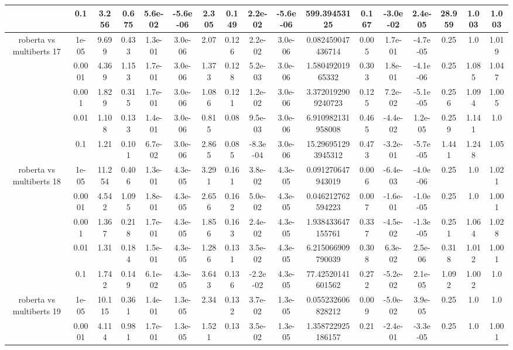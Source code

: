 \begin{tabular}{|c|c|c|c|c|c|c|c|c|c|c|c|c|c|c|c|c|}
 & 0.1 & 3.256 & 0.675 & 5.6e-02 & -5.6e-06 & 2.305 & 0.149 & 2.2e-02 & -5.6e-06 & 599.39453125 & 0.167 & -3.0e-02 & 2.4e-05 & 28.959 & 1.003 & 1.003 \\
\hline
\multirow{5}{*}{roberta  vs multiberts 17} & 1e-05 & 9.699 & 0.433 & 1.3e-01 & 3.0e-06 & 2.07 & 0.126 & 2.2e-02 & 3.0e-06 & 0.082459047436714 & 0.005 & 1.7e-01 & -4.7e-05 & 0.25 & 1.0 & 1.019 \\
 & 0.0001 & 4.369 & 1.153 & 1.7e-01 & 3.0e-06 & 1.373 & 0.128 & 5.2e-03 & 3.0e-06 & 1.58049201965332 & 0.303 & 1.8e-01 & -4.1e-06 & 0.25 & 1.085 & 1.047 \\
 & 0.001 & 1.829 & 0.315 & 1.7e-01 & 3.0e-06 & 1.086 & 0.121 & 1.2e-02 & 3.0e-06 & 3.3720192909240723 & 0.125 & 7.2e-02 & -5.1e-05 & 0.256 & 1.094 & 1.005 \\
 & 0.01 & 1.108 & 0.133 & 1.4e-01 & 3.0e-06 & 0.815 & 0.08 & 9.5e-03 & 3.0e-06 & 6.910982131958008 & 0.465 & -4.4e-02 & 1.2e-05 & 0.259 & 1.141 & 1.0 \\
 & 0.1 & 1.21 & 0.101 & 6.7e-02 & 3.0e-06 & 2.865 & 0.085 & -8.3e-04 & 3.0e-06 & 15.296951293945312 & 0.473 & -3.2e-01 & -5.7e-05 & 1.441 & 1.248 & 1.05 \\
\hline
\multirow{5}{*}{roberta  vs multiberts 18} & 1e-05 & 11.254 & 0.406 & 1.3e-01 & 4.3e-05 & 3.291 & 0.161 & 3.8e-02 & 4.3e-05 & 0.091270647943019 & 0.006 & -6.4e-03 & -4.0e-06 & 0.25 & 1.0 & 1.021 \\
 & 0.0001 & 4.542 & 1.095 & 1.8e-01 & 4.3e-05 & 2.656 & 0.162 & 5.0e-02 & 4.3e-05 & 0.046212762594223 & 0.007 & -1.6e-01 & -1.0e-05 & 0.25 & 1.0 & 1.001 \\
 & 0.001 & 1.367 & 0.218 & 1.7e-01 & 4.3e-05 & 1.856 & 0.163 & 2.4e-02 & 4.3e-05 & 1.938433647155761 & 0.337 & -4.5e-02 & -1.3e-05 & 0.251 & 1.064 & 1.028 \\
 & 0.01 & 1.31 & 0.184 & 1.5e-01 & 4.3e-05 & 1.286 & 0.131 & 3.5e-02 & 4.3e-05 & 6.215066909790039 & 0.308 & 6.3e-02 & 2.5e-06 & 0.318 & 1.012 & 1.001 \\
 & 0.1 & 1.742 & 0.149 & 6.1e-02 & 4.3e-05 & 3.643 & 0.136 & -2.2e-02 & 4.3e-05 & 77.42520141601562 & 0.272 & -5.2e-02 & 2.1e-05 & 1.092 & 1.002 & 1.0 \\
\hline
\multirow{5}{*}{roberta  vs multiberts 19} & 1e-05 & 10.115 & 0.361 & 1.4e-01 & 1.3e-05 & 2.34 & 0.132 & 3.7e-02 & 1.3e-05 & 0.055232606828212 & 0.009 & -5.0e-02 & 3.9e-05 & 0.25 & 1.0 & 1.0 \\
 & 0.0001 & 4.114 & 0.981 & 1.7e-01 & 1.3e-05 & 1.521 & 0.13 & 3.5e-02 & 1.3e-05 & 1.358722925186157 & 0.21 & -2.4e-01 & -3.3e-05 & 0.25 & 1.0 & 1.001 \\

\end{tabular}
